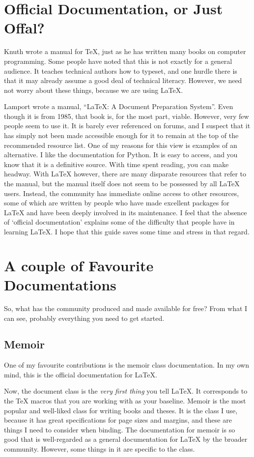 \documentclass[11pt, oneside]{memoir}
\begin{document}
\section*{Official Documentation, or Just Offal?}

Knuth wrote a manual for TeX, just as he has written many books on computer programming. Some people have noted that this is not exactly for a general audience. It teaches technical authors how to typeset, and one hurdle there is that it may already assume a good deal of technical literacy. However, we need not worry about these things, because we are using LaTeX.

Lamport wrote a manual, ``LaTeX: A Document Preparation System''. Even though it is from 1985, that book is, for the most part, viable. However, very few people seem to use it. It is barely ever referenced on forums, and I suspect that it has simply not been made accessible enough for it to remain at the top of the recommended resource list. One of my reasons for this view is examples of an alternative. I like the documentation for Python. It is easy to access, and you know that it is a definitive source. With time spent reading, you can make headway. With LaTeX however, there are many disparate resources that refer to the manual, but the manual itself does not seem to be possessed by all LaTeX users. Instead, the community has immediate online access to other resources, some of which are written by people who have made excellent packages for LaTeX and have been deeply involved in its maintenance. I feel that the absence of `official documentation' explains some of the difficulty that people have in learning LaTeX. I hope that this guide saves some time and stress in that regard.

\section{A couple of Favourite Documentations}
So, what has the community produced and made available for free? From what I can see, probably everything you need to get started.

\subsection{Memoir}

One of my favourite contributions is the memoir class documentation. In my own mind, this is the official documentation for LaTeX.

Now, the document class is the \emph{very first thing} you tell LaTeX. It corresponds to the TeX macros that you are working with as your baseline. Memoir is the most popular and well-liked class for writing books and theses. It is the class I use, because it has great specifications for page sizes and margins, and these are things I need to consider when binding. The documentation for memoir is so good that is well-regarded as a general documentation for LaTeX by the broader community. However, some things in it are specific to the class.
\end{document}
